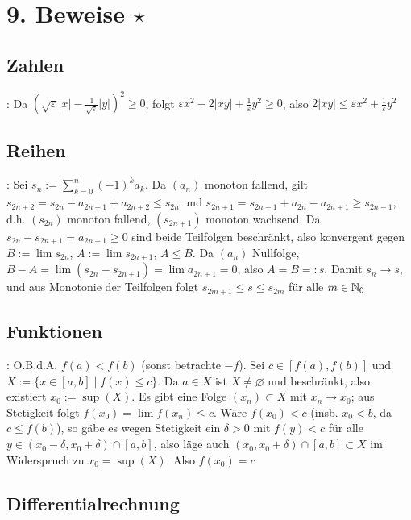 \section{9. Beweise \texorpdfstring{$\star$}{*}}

\subsection{Zahlen}

\Bew {}: Da $\left(\sqrt{\varepsilon}|x| - \frac{1}{\sqrt{\varepsilon}}|y|\right)^2\ge 0$, folgt
$\varepsilon x^2 - 2|xy| + \frac{1}{\varepsilon}y^2\ge 0$, also $2|xy|\le \varepsilon x^2 + \frac{1}{\varepsilon}y^2$

\subsection{Reihen}

\Bew {}: Sei $s_n := \sum_{k=0}^{n}(-1)^k a_k$. Da $(a_n)$ monoton fallend, gilt
$s_{2n+2} = s_{2n} - a_{2n+1} + a_{2n+2}\le s_{2n}$ und $s_{2n+1} = s_{2n-1} + a_{2n} - a_{2n+1}\ge s_{2n-1}$,
d.h. $(s_{2n})$ monoton fallend, $(s_{2n+1})$ monoton wachsend. Da $s_{2n} - s_{2n+1} = a_{2n+1}\ge 0$
sind beide Teilfolgen beschränkt, also konvergent gegen $B := \lim s_{2n}$, $A := \lim s_{2n+1}$, $A\le B$.
Da $(a_n)$ Nullfolge, $B - A = \lim(s_{2n} - s_{2n+1}) = \lim a_{2n+1} = 0$, also $A = B =: s$.
Damit $s_n \to s$, und aus Monotonie der Teilfolgen folgt $s_{2m+1}\le s\le s_{2m}$ für alle $m \in \mathbb{N}_0$

\subsection{Funktionen}

\Bew {}: O.B.d.A. $f(a) < f(b)$ (sonst betrachte $-f$). Sei $c \in [f(a), f(b)]$ und
$X := \{x \in [a,b] \mid f(x)\le c\}$. Da $a \in X$ ist $X\ne\varnothing$ und beschränkt, also existiert
$x_0 := \sup(X)$. Es gibt eine Folge $(x_n) \subset X$ mit $x_n \to x_0$; aus Stetigkeit folgt
$f(x_0) = \lim f(x_n)\le c$. Wäre $f(x_0) < c$ (insb. $x_0 < b$, da $c\le f(b)$), so gäbe es wegen
Stetigkeit ein $\delta > 0$ mit $f(y) < c$ für alle $y \in (x_0-\delta, x_0+\delta) \cap [a,b]$, also läge auch
$(x_0, x_0+\delta) \cap [a,b] \subset X$ im Widerspruch zu $x_0 = \sup(X)$. Also $f(x_0) = c$

\subsection{Differentialrechnung}

